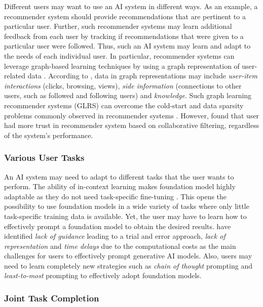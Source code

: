 Different users may want to use an AI system in different ways. As an example, a recommender system should
provide recommendations that are pertinent to a particular user. Further, such recommender systems may learn
additional feedback from each user by tracking if recommendations that were given to a particular user were
followed. Thus, such an AI system may learn and adapt to the needs of each individual user. 
In particular, recommender systems can leverage graph-based learning techniques by using a graph representation
of user-related data \citep{zhangRecommendingGraphsComprehensive2023}. According to \cite{dengRecommenderSystemsBased2022},
data in graph representations may include \textit{user-item interactions} (clicks, browsing, views), \textit{side information}
(connections to other users, such as followed and following users) and \textit{knowledge}. Such graph learning recommender
systems (GLRS) can overcome the cold-start and data sparsity problems commonly observed in recommender systems
\citep{zhangRecommendingGraphsComprehensive2023}. However, \cite{liaoUserTrustRecommendation2022} found that user had
more trust in recommender system based on collaborative filtering, regardless of the system's performance.

\subsubsection{Various User Tasks}

An AI system may need to adapt to different tasks that the user wants to perform. The ability of in-context learning makes
foundation model highly adaptable as they do not need task-specific fine-tuning \citep{brownLanguageModelsAre2020}. This opens
the possibility to use foundation models in a wide variety of tasks where only little task-specific training data is available.
Yet, the user may have to learn how to effectively prompt a foundation model to obtain the desired results. \cite{dangHowPromptOpportunities2022}
have identified \textit{lack of guidance} leading to a trial and error approach, \textit{lack of representation} and \textit{time delays}
due to the computational costs as the main challenges for users to effectively prompt generative AI models. Also, users may need to
learn completely new strategies such as \textit{chain of thought} prompting \citep{weiChainofThoughtPromptingElicits2023} and
\textit{least-to-most} prompting \citep{zhouLeasttoMostPromptingEnables2023} to effectively adopt foundation models. 

\subsubsection{Joint Task Completion}

